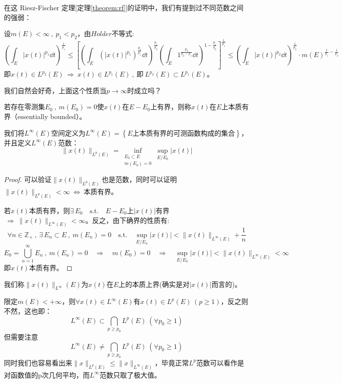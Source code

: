 在这 Riesz-Fischer 定理[定理\ref{theorem:rf}]的证明中，我们有提到过不同范数之间的强弱：
\begin{proposition}[范数强弱]
设$m(E)<\infty \ , \ p_1<p_2$，由$H\ddot{o}lder$不等式:
\[\left(\int_E|x(t)|^{p_1}\dd t\right)^{\frac{1}{p_1}} \leq \left[\left(\int_E\left(|x(t)|^{p_1}\right)^{\frac{p_2}{p_1}}\dd t\right)^{\frac{p_1}{p_2}}\left(\int_E1^{\frac{p_2}{p_2-p_1}}\dd t\right)^{1-\frac{p_1}{q_2}}\right]^{\frac{1}{p_1}} \leq \left(\int_E|x(t)|^{p_2}\dd t\right)^{\frac{1}{p_2}} \cdot m(E)^{\frac{1}{p_1}-\frac{1}{p_2}}\]
即$x(t) \in L^{p_2}(E) \ \Rightarrow \ x(t) \in L^{p_1}(E) \ , \ \text{即} \ L^{p_2}(E) \subset L^{p_1}(E)$。
\end{proposition}

我们自然会好奇，上面这个性质当$p \to \infty$时成立吗？
\begin{definition}[本质有界]
若存在零测集$E_0 \ , \ m(E_0)=0$使$x(t)$在$E-E_0$上有界，则称$x(t)$在$E$上本质有界（essentially bounded）。
\end{definition}
\begin{definition}
我们将$L^{\infty}(E)$空间定义为$L^{\infty}(E)=\left\{E\text{上本质有界的可测函数构成的集合}\right\}$，并且定义$L^{\infty}(E)$范数：
\[\|x(t)\|_{L^p(E)}=\mathop \text{inf}\limits_{\substack{E_0 \subset E \\ m(E_0)=0}}\mathop \text{sup}\limits_{E/E_0}|x(t)|\]
\end{definition}
\begin{proof}
可以验证$\|x(t)\|_{L^p(E)}$也是范数，同时可以证明$\|x(t)\|_{L^p(E)}<\infty \ \Leftrightarrow \ $本质有界。

若$x(t)$本质有界，则$\exists \, E_0 \quad \text{s.t.} \quad E-E_0$上$|x(t)|$有界$ \ \Rightarrow \ \|x(t)\|_{L^{\infty}(E)}<\infty$。反之，由下确界的性质有:
\[\forall n \in \mathbb{Z}_+ \ , \ \exists \,E_n \subset E \ , \ m(E_n)=0 \quad \text{s.t.} \quad \mathop \text{sup}\limits_{E/E_n}|x(t)|<\|x(t)\|_{L^{\infty}(E)}+\frac{1}{n}\]
\[E_0=\bigcup_{n=1}^{\infty}E_n \ , \ m(E_n)=0 \quad \Rightarrow \quad m(E_0)=0 \quad \Rightarrow \quad \mathop \text{sup}\limits_{E/E_0}|x(t)|<\|x(t)\|_{L^{\infty}(E)}<\infty\]
即$x(t)$本质有界。
\end{proof}

\begin{definition}[本质上界] \label{infty}
    我们称$\|x(t)\|_{L^{\infty}} (E)$为$x(t)$在$E$上的本质上界(确实是对$|x(t)|$而言的)。
\end{definition}

\begin{proposition}
限定$m(E)<+\infty$，则$\forall x(t) \in L^{\infty}(E)$有$x(t) \in L^p(E) \ (p \geq 1)$，反之则不然，这也即：
\[L^{\infty}(E) \subset \bigcap_{p \geq p_0}L^{p}(E) \ (\forall p_0 \geq 1)\]
但需要注意
\[L^{\infty}(E) \neq \bigcap_{p \geq p_0}L^{p}(E) \ (\forall p_0 \geq 1)\]
同时我们也容易看出来$\|x\|_{L^p(E)} \leq \|x\|_{L^{\infty}(E)}$，毕竟正常$L^p$范数可以看作是对函数值的p次几何平均，而$L^{\infty}$范数只取了极大值。
\end{proposition}

